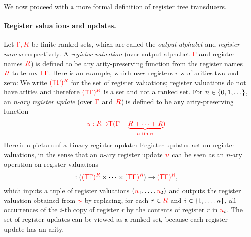 

We now proceed with a more formal definition of register tree transducers.

\paragraph*{Register valuations and updates.}   Let ${\color{red}{\Gamma, R}}$ be finite ranked sets, which are called the \emph{output alphabet} and \emph{register names} respectively.  
A \emph{register valuation} (over output alphabet ${\color{red}{\Gamma}}$ and register names ${\color{red}{R}}$) is defined to be any arity-preserving function from the register names ${{\color{red}{R}}}$ to terms ${\color{red}{\mathsf T}} {\color{red}{\Gamma}}$. Here is an example, which uses registers $r,s$ of arities two and zero:
We write ${\color{red}{({\color{red}{\mathsf T}}{\color{red}{\Gamma}})^{{{\color{red}{R}}}}}}$ for the set of register valuations; register valuations do not have arities and therefore ${\color{red}{({\color{red}{\mathsf T}}{\color{red}{\Gamma}})^{{{\color{red}{R}}}}}}$ is a set and not a ranked set. For  $n \in \{0,1,\ldots\}$, an \emph{$n$-ary register update} (over ${\color{red}{\Gamma}}$ and ${\color{red}{R}}$) is defined to be any arity-preserving function
\begin{align}\label{eq:reg-operation}
    {\color{red}{u : {{\color{red}{R}}}{\color{red}{\to}}{\color{red}{\mathsf T}}( {\color{red}{\Gamma}}+ \underbrace{{{{\color{red}{R}}}+ \cdots + {{\color{red}{R}}}}}_{\text{$n$ times}})}}
\end{align}
Here is a picture of a binary register update:
Register updates act on register valuations, in the sense that an $n$-ary register update ${\color{red}{u}}$ can be seen as an $n$-ary operation on  register valuations
\begin{align*}
    [\ranked u] : (\regvals \rGamma \regnames \times \cdots \times \regvals \rGamma \regnames) \to \regvals \rGamma \regnames,
\end{align*}
which inputs a tuple of register valuations $({\color{red}{u}}_1,\ldots,{\color{red}{u}}_2)$ and outputs the register valuation obtained from ${\color{red}{u}}$ by replacing, for each $r \in {{\color{red}{R}}}$ and $i \in \{1,\ldots,n\}$, all occurrences of the $i$-th copy of register $r$  by the contents of register $r$ in ${\color{red}{u}}_i$. The set of register updates can be viewed as a ranked set, because each register update has an arity. 

